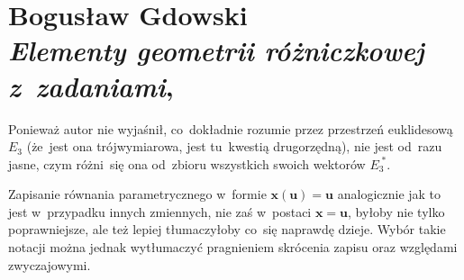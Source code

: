 \documentclass[a4paper,11pt]{article}
\numberwithin{equation}{section}
\begin{document}
\newpage

\section{ %
  Bogusław Gdowski \\
  \textit{Elementy geometrii różniczkowej z~zadaniami},
  \cite{GdowskiElementGeometriiRozniczkowejZZadaniami1999}}

\vspace{0em}



\vspace{0em}


\noindent
{} Ponieważ autor nie wyjaśnił, co~dokładnie rozumie przez
przestrzeń euklidesową $E_{ 3 }$ (że~jest ona trójwymiarowa, jest
tu~kwestią drugorzędną), nie jest od~razu jasne, czym różni~się ona
od~zbioru wszystkich swoich wektorów $E_{ 3 }^{ \; * }$.

\VerSpaceFour





\noindent
{} Zapisanie równania parametrycznego w~formie
$\boldsymbol{ x( u ) } = \boldsymbol{ u }$ analogicznie jak to jest
w~przypadku innych zmiennych, nie zaś w~postaci $\boldsymbol{ x } =
\mathbf{ u }$, byłoby nie tylko poprawniejsze, ale też lepiej
tłumaczyłoby co~się naprawdę dzieje. Wybór takie notacji można jednak
wytłumaczyć pragnieniem skrócenia zapisu oraz względami zwyczajowymi.

\VerSpaceFour





\newpage

\end{document}

